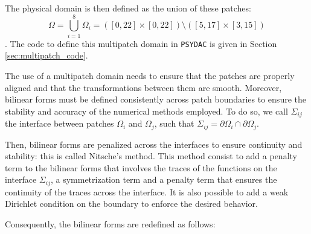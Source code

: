 \documentclass[a4paper,12pt,twoside]{report}
\begin{document}
The physical domain is then defined as the union of these patches: $$\Omega = \bigcup_{i=1}^8 \Omega_i = ([0,22] \times [0,22]) \setminus ([5,17] \times [3,15])$$.
The code to define this multipatch domain in \texttt{PSYDAC} is given in Section \ref{sec:multipatch_code}.

The use of a multipatch domain needs to ensure that the patches are properly aligned and that the transformations between them are smooth. Moreover, bilinear forms must be defined consistently across patch boundaries to ensure the stability and accuracy of the numerical methods employed. 
To do so, we call $\Sigma_{ij}$ the interface between patches $\Omega_i$ and $\Omega_j$, such that $\Sigma_{ij} = \partial \Omega_i \cap \partial \Omega_j$.

Then, bilinear forms are penalized across the interfaces to ensure continuity and stability: this is called Nitsche's method. 
This method consist to add a penalty term to the bilinear forms that involves the traces of the functions on the interface $\Sigma_{ij}$, a symmetrization term and a penalty term that ensures the continuity of the traces across the interface. It is also possible to add a weak Dirichlet condition on the boundary to enforce the desired behavior.

Consequently, the bilinear forms are redefined as follows:
\end{document}

